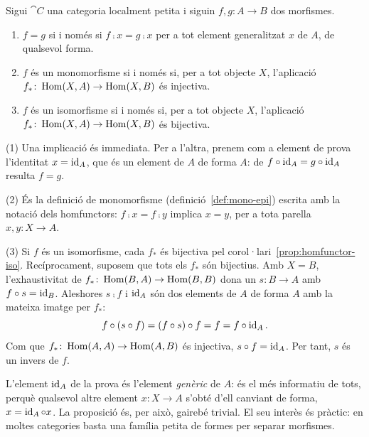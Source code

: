 \begin{proposicio}\label{prop:elements-generalitzats}
Sigui $\cat{C}$ una categoria localment petita i siguin $f,g\colon A\to B$ dos morfismes.
\begin{enumerate}
\item $f=g$ si i només si $f\comp x=g\comp x$ per a tot element generalitzat $x$ de $A$, de qualsevol forma.
\item $f$ és un monomorfisme si i només si, per a tot objecte $X$, l'aplicació $f_*\colon\operatorname{Hom}(X,A)\to\operatorname{Hom}(X,B)$ és injectiva.
\item $f$ és un isomorfisme si i només si, per a tot objecte $X$, l'aplicació $f_*\colon\operatorname{Hom}(X,A)\to\operatorname{Hom}(X,B)$ és bijectiva.
\end{enumerate}
\end{proposicio}

\begin{prova}
(1) Una implicació és immediata. Per a l'altra, prenem com a element de prova l'identitat $x=\operatorname{id}_A$, que és un element de $A$ de forma $A$: de $f\circ\operatorname{id}_A=g\circ\operatorname{id}_A$ resulta $f=g$.

(2) És la definició de monomorfisme (definició~\ref{def:mono-epi}) escrita amb la notació dels homfunctors: $f\comp x=f\comp y$ implica $x=y$, per a tota parella $x,y\colon X\to A$.

(3) Si $f$ és un isomorfisme, cada $f_*$ és bijectiva pel corol·lari~\ref{prop:homfunctor-iso}. Recíprocament, suposem que tots els $f_*$ són bijectius. Amb $X=B$, l'exhaustivitat de $f_*\colon\operatorname{Hom}(B,A)\to\operatorname{Hom}(B,B)$ dona un $s\colon B\to A$ amb $f\circ s=\operatorname{id}_B$. Aleshores $s\comp f$ i $\operatorname{id}_A$ són dos elements de $A$ de forma $A$ amb la mateixa imatge per $f_*$:
\[
f\circ(s\circ f)=(f\circ s)\circ f=f=f\circ\operatorname{id}_A.
\]
Com que $f_*\colon\operatorname{Hom}(A,A)\to\operatorname{Hom}(A,B)$ és injectiva, $s\circ f=\operatorname{id}_A$. Per tant, $s$ és un invers de $f$.
\end{prova}

L'element $\operatorname{id}_A$ de la prova és l'element \emph{genèric} de $A$: és el més informatiu de tots, perquè qualsevol altre element $x\colon X\to A$ s'obté d'ell canviant de forma, $x=\operatorname{id}_A\circ x$. La proposició és, per això, gairebé trivial. El seu interès és pràctic: en moltes categories basta una família petita de formes per separar morfismes.

